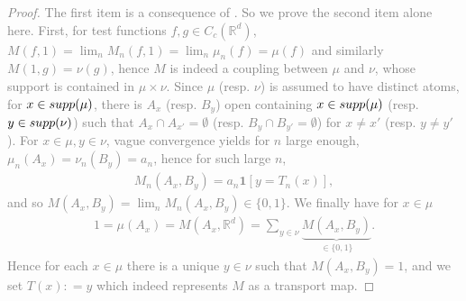 \documentclass[12pt]{article}
\newcommand{\R}{\mathbb{R}}
\newcommand{\1}{\mathbf{1}}
\newcommand{\obsolete}[1]{\textcolor{gray}{{#1}}}
\newcommand{\RL}[1]{\textcolor{blue}{#1}}
\newcommand{\obsolete}[1]{}%
\newcommand{\RL}[1]{#1}%
\begin{document}
{{{{{{\obsolete{\begin{proof}
The first  item is a consequence of  \cite[Theorem 16.15]{kallenberg2002foundations}.  So we prove the second item alone here. First, for {test functions $f,g \in C_c(\R^d)$}, $ M(f,1) =\lim_{n}M_{n}(f,1) = \lim_{n}\mu _{n}(f) = \mu (f) $ and similarly $ M(1,g) = {\nu}(g)$, hence $ M$ is indeed a coupling between $ \mu $ and ${\nu}$, {whose} support is contained in $ \mu \times {\nu}.$ {Since $ \mu $ (resp. $ \nu $) is assumed to have distinct atoms, for $ x\in { \rm supp}(\mu )$, there is $ A_{x}$ (resp. $ B_{y}$) open containing $ x\in { \rm supp}(\mu )$ (resp. $ y\in { \rm supp}(\nu )$) such that $ A_{x} \cap A_{x'} = \emptyset $ (resp. $ B_{y}\cap B_{y'} = \emptyset $) for $ x\neq x'$ (resp. $ y\neq y'$).}
 For $ x\in \mu ,y\in {\nu}$, vague convergence yields for $ n$ large enough, $ \mu _{n}(A_{x}) = {\nu}_{n}(B_{y}) = a_{n}$, {hence for such large $n$,}
\begin{align*}M_{n}(A_{x},B_{y}) = a_{n}\1[y = T_{n}(x)],
\end{align*}
and so $ M(A_{x},B_{y}) = \lim_{n}M_{n}(A_{x},B_{y})\in \{0,1\}$. We finally have for $ x\in \mu $
\begin{align*}
1 = \mu (A_{x}) = M(A_{x},\mathbb{R}^{d}) = \sum_{y\in {\nu}}\underbrace{M(A_{x},B_{y})}_{\in \{0,1\}}.
\end{align*}
Hence for each $ x\in \mu $ there is a unique $ y\in {\nu}$ such that $ M(A_{x},B_{y}) = 1$, and we set $ T(x): = y$ which indeed represents $ M$ as a transport map.

\end{proof}}}}}}}}
\end{document}
